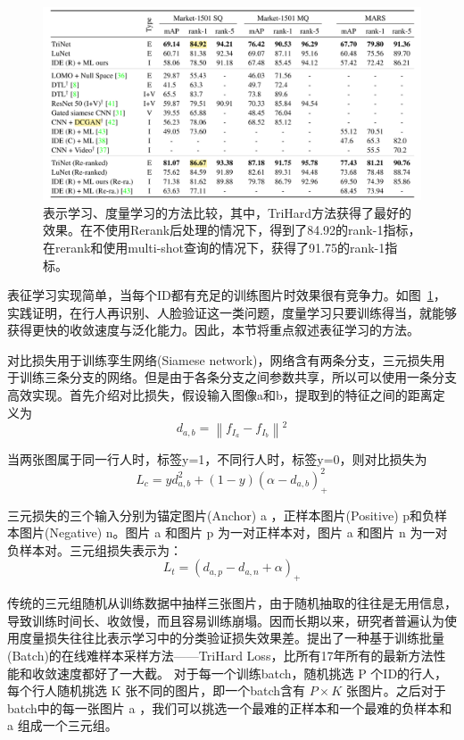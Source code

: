 \begin{figure}
	\centering
	\captionsetup{width=.88\textwidth}
	\includegraphics[width=\linewidth,keepaspectratio]{data/kaitibaogao/loss-perf.png}
	\caption{\kaiti 表示学习、度量学习的方法比较，其中，TriHard方法获得了最好的效果。在不使用Rerank后处理的情况下，得到了84.92的rank-1指标，在rerank和使用multi-shot查询的情况下，获得了91.75的rank-1指标。}
	\label{figure:loss}
\end{figure}

表征学习实现简单，当每个ID都有充足的训练图片时效果很有竞争力。如图~\ref{figure:loss}，实践证明，在行人再识别、人脸验证这一类问题，度量学习只要训练得当，就能够获得更快的收敛速度与泛化能力。因此，本节将重点叙述表征学习的方法。

对比损失用于训练孪生网络(Siamese network)，网络含有两条分支，三元损失用于训练三条分支的网络。但是由于各条分支之间参数共享，所以可以使用一条分支高效实现。首先介绍对比损失，假设输入图像a和b，提取到的特征之间的距离定义为
\begin{equation} {d_{a,b}} = \left\|{f_{{I_a}}} - {f_{{I_b}}}\right\|{^2}\end{equation}

当两张图属于同一行人时，标签y=1，不同行人时，标签y=0，则对比损失为
\begin{equation} {L_c} = yd_{a,b}^2 + (1 - y)(\alpha  - {d_{a,b}})_+^2\end{equation}

三元损失的三个输入分别为锚定图片(Anchor) a ，正样本图片(Positive) p和负样本图片(Negative) n。图片 a 和图片 p 为一对正样本对，图片 a 和图片 n 为一对负样本对。三元组损失表示为：
\begin{equation} {L_t} = {({d_{a,p}} - {d_{a,n}} + \alpha )_ + }\end{equation}

传统的三元组随机从训练数据中抽样三张图片，由于随机抽取的往往是无用信息，导致训练时间长、收敛慢，而且容易训练崩塌。因而长期以来，研究者普遍认为使用度量损失往往比表示学习中的分类验证损失效果差。\cite{liu2017quality}提出了一种基于训练批量(Batch)的在线难样本采样方法——TriHard Loss，比所有17年所有的最新方法性能和收敛速度都好了一大截。
对于每一个训练batch，随机挑选 P 个ID的行人，每个行人随机挑选 K 张不同的图片，即一个batch含有 $P\times K$ 张图片。之后对于batch中的每一张图片 a ，我们可以挑选一个最难的正样本和一个最难的负样本和 a 组成一个三元组。

